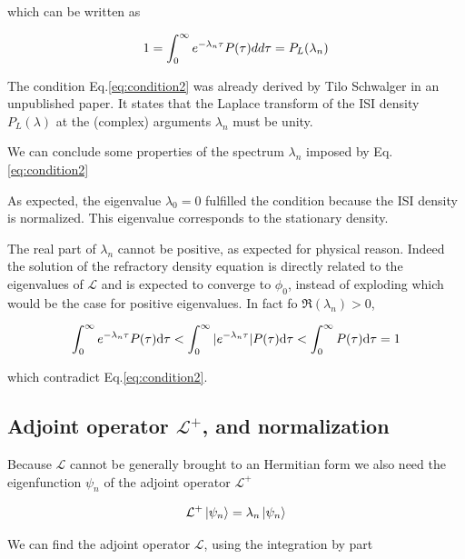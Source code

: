 \documentclass[a4paper,11pt,twoside]{article}
\def \dd  {{\rm d}}
\numberwithin{equation}{section}
\begin{document}
which can be written as

\begin{equation}
\label{eq:condition2}
1=\int_0^\infty e^{-\lambda_n \tau}P(\tau)dd\tau=P_L(\lambda_n)\\
\end{equation}

The condition Eq.\eqref{eq:condition2} was already derived by Tilo Schwalger in an unpublished paper. It states that the Laplace transform of the ISI density $P_L(\lambda)$ at the (complex) arguments $\lambda_{n}$ must be unity. 

We can conclude some properties of the spectrum {$\lambda_n$} imposed by Eq.\eqref{eq:condition2}

As expected, the eigenvalue $\lambda_0=0$ fulfilled the condition because the ISI density is normalized. This eigenvalue corresponds to the stationary density.

The real part of $\lambda_n$ cannot be positive, as expected for physical reason. Indeed the solution of the refractory density equation is directly related to the eigenvalues of $\mathcal{L}$ and is expected to converge to $\phi_0$, instead of exploding which would be the case for positive eigenvalues. In fact fo $\Re(\lambda_n)>0$,

\begin{equation}
\int_0^\infty e^{-\lambda_n \tau} P(\tau) \dd\tau<\int_0^\infty |e^{-\lambda_n\tau} |P(\tau) \dd\tau<\int_0^\infty P(\tau) \dd\tau=1
\end{equation}

which contradict Eq.\eqref{eq:condition2}.



\subsection{Adjoint operator $\mathcal{L}^+$, and normalization}

Because $\mathcal{L}$ cannot be generally brought to an Hermitian form we also need  the eigenfunction $\psi_n$ of the adjoint operator  $\mathcal{L}^{+}$

\begin{equation}
\label{eq:Ldegaoperator}
\mathcal{L}^+\ket{\psi_n}=\lambda_n\ket{\psi_n}
\end{equation}

We can find the adjoint operator $\mathcal{L}$, using the integration by part
\end{document}
